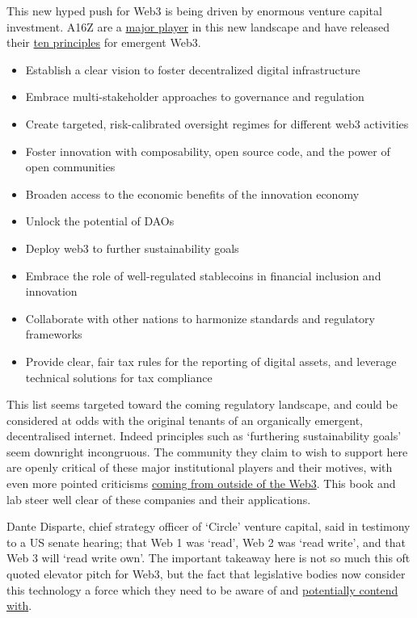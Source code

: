This new hyped push for Web3 is being driven by enormous venture capital investment. A16Z are a \href{https://a16z.com/2022/01/07/9b-to-build-the-future/}{major player} in this new landscape and have released their \href{https://a16z.com/2022/01/07/how-to-build-a-better-internet-10-principles-for-world-leaders-shaping-the-future-of-web3/}{ten principles} for emergent Web3. 
\begin{itemize}
\item Establish a clear vision to foster decentralized digital infrastructure
\item Embrace multi-stakeholder approaches to governance and regulation
\item Create targeted, risk-calibrated oversight regimes for different web3 activities
\item Foster innovation with composability, open source code, and the power of open communities
\item Broaden access to the economic benefits of the innovation economy
\item Unlock the potential of DAOs
\item Deploy web3 to further sustainability goals
\item Embrace the role of well-regulated stablecoins in financial inclusion and innovation
\item Collaborate with other nations to harmonize standards and regulatory frameworks
\item Provide clear, fair tax rules for the reporting of digital assets, and leverage technical solutions for tax compliance
\end{itemize}
This list seems targeted toward the coming regulatory landscape, and could be considered at odds with the original tenants of an organically emergent, decentralised internet. Indeed principles such as `furthering sustainability goals' seem downright incongruous. The community they claim to wish to support here are openly critical of these major institutional players and their motives, with even more pointed criticisms \href{https://www.profgalloway.com/web3/}{coming from outside of the Web3}. This book and lab steer well clear of these companies and their applications.\par
Dante Disparte, chief strategy officer of `Circle' venture capital, said in testimony to a US senate hearing; that Web 1 was `read', Web 2 was `read write', and that Web 3 will `read write own'. The important takeaway here is not so much this oft quoted elevator pitch for Web3, but the fact that legislative bodies now consider this technology a force which they need to be aware of and \href{https://a16z.com/2021/12/17/prediction-for-the-new-year-a-web3-midterm/}{potentially contend with}.\par
